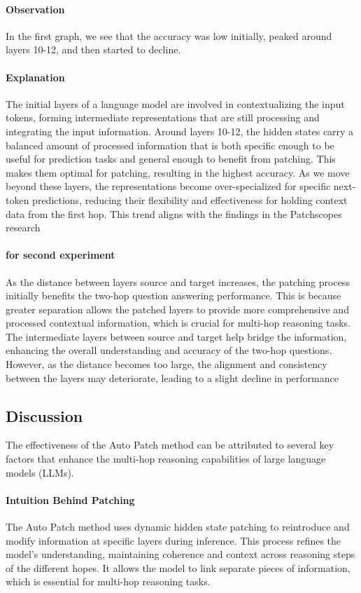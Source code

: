 \documentclass[11pt]{article}
\begin{document}
\paragraph{Observation}
In the first graph, we see that the accuracy was low initially, peaked around layers 10-12, and then started to decline.
\paragraph{Explanation} The initial layers of a language model are involved in contextualizing the input tokens, forming intermediate representations that are still processing and integrating the input information. Around layers 10-12, the hidden states carry a balanced amount of processed information that is both specific enough to be useful for prediction tasks and general enough to benefit from patching. This makes them optimal for patching, resulting in the highest accuracy. As we move beyond these layers, the representations become over-specialized for specific next-token predictions, reducing their flexibility and effectiveness for holding context data from the first hop. This trend aligns with the findings in the Patchscopes research \cite{ghandeharioun2024patchscopes}
\paragraph{for second experiment} 
As the distance between layers source and target increases, the patching process initially benefits the two-hop question answering performance. This is because greater separation allows the patched layers to provide more comprehensive and processed contextual information, which is crucial for multi-hop reasoning tasks. The intermediate layers between source and target help bridge the information, enhancing the overall understanding and accuracy of the two-hop questions. However, as the distance becomes too large, the alignment and consistency between the layers may deteriorate, leading to a slight decline in performance

\subsection{Discussion}
The effectiveness of the Auto Patch method can be attributed to several key factors that enhance the multi-hop reasoning capabilities of large language models (LLMs).

\paragraph{Intuition Behind Patching} The Auto Patch method uses dynamic hidden state patching to reintroduce and modify information at specific layers during inference. This process refines the model’s understanding, maintaining coherence and context across reasoning steps of the different hopes. It allows the model to link separate pieces of information, which is essential for multi-hop reasoning tasks.
\end{document}
